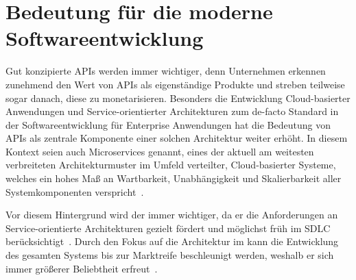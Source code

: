\section{Bedeutung für die moderne Softwareentwicklung}
Gut konzipierte \acp{API} werden immer wichtiger, denn Unternehmen erkennen zunehmend den Wert von \acp{API} als eigenständige Produkte und streben teilweise sogar danach, diese zu monetarisieren.
Besonders die Entwicklung Cloud-basierter Anwendungen und Service-orientierter Architekturen zum de-facto Standard in der Softwareentwicklung für Enterprise Anwendungen hat die Bedeutung von \acp{API} als zentrale Komponente einer solchen Architektur weiter erhöht.
In diesem Kontext seien auch Microservices genannt, eines der aktuell am weitesten verbreiteten Architekturmuster im Umfeld verteilter, Cloud-basierter Systeme, welches ein hohes Maß an Wartbarkeit, Unabhängigkeit und Skalierbarkeit aller Systemkomponenten verspricht~\cites[73-75]{bea22}[5]{kul23}.

Vor diesem Hintergrund wird der \AFA immer wichtiger, da er die Anforderungen an Service-orientierte Architekturen gezielt fördert und möglichst früh im \ac{SDLC} berücksichtigt~\cite[1627]{cha21}.
Durch den Fokus auf die Architektur im \AFA kann die Entwicklung des gesamten Systems bis zur Marktreife beschleunigt werden, weshalb er sich immer größerer Beliebtheit erfreut~\cite[76]{bea22}.